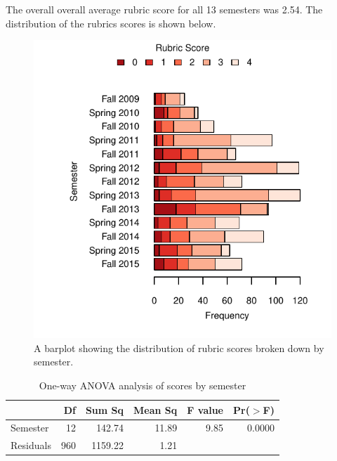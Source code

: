 \documentclass[fleqn,10pt]{SelfArx}\usepackage[]{graphicx}\usepackage[]{color}
\begin{document}
The overall overall average rubric score for all 13 semesters was 2.54. The distribution of the rubrics scores is shown below.

\begin{figure}[h]\centering

\includegraphics[width=\columnwidth,viewport = 30 0 288 288]{./figure/barplot}
\protect\caption{A barplot showing the distribution of rubric scores broken down by semester.}
\label{fig:barplot}
\end{figure}

\begin{center}
\begin{table}[ht]
\centering
\caption{One-way ANOVA analysis of scores by semester} 
\label{tab:anova}
\begin{tabular}{lrrrrr}
  \hline
 & Df & Sum Sq & Mean Sq & F value & Pr($>$F) \\ 
  \hline
Semester & 12 & 142.74 & 11.89 & 9.85 & 0.0000 \\ 
  Residuals & 960 & 1159.22 & 1.21 &  &  \\ 
   \hline
\end{tabular}
\end{table}

\end{center}
\end{document}
